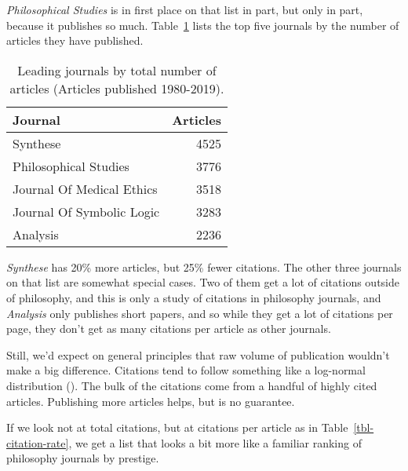 \documentclass[
  10pt,
  letterpaper,
  DIV=11,
  numbers=noendperiod,
  twoside]{scrartcl}
\begin{document}
\emph{Philosophical Studies} is in first place on that list in part, but
only in part, because it publishes so much. Table~\ref{tbl-all-articles}
lists the top five journals by the number of articles they have
published.

\begin{longtable}[]{@{}lr@{}}

\caption{\label{tbl-all-articles}Leading journals by total number of
articles (Articles published 1980-2019).}

\tabularnewline

\toprule\noalign{}
Journal & Articles \\
\midrule\noalign{}
\endhead
\bottomrule\noalign{}
\endlastfoot
Synthese & 4525 \\
Philosophical Studies & 3776 \\
Journal Of Medical Ethics & 3518 \\
Journal Of Symbolic Logic & 3283 \\
Analysis & 2236 \\

\end{longtable}

\emph{Synthese} has 20\% more articles, but 25\% fewer citations. The
other three journals on that list are somewhat special cases. Two of
them get a lot of citations outside of philosophy, and this is only a
study of citations in philosophy journals, and \emph{Analysis} only
publishes short papers, and so while they get a lot of citations per
page, they don't get as many citations per article as other journals.

Still, we'd expect on general principles that raw volume of publication
wouldn't make a big difference. Citations tend to follow something like
a log-normal distribution
(). The bulk of
the citations come from a handful of highly cited articles. Publishing
more articles helps, but is no guarantee.

If we look not at total citations, but at citations per article as in
Table~\ref{tbl-citation-rate}, we get a list that looks a bit more like
a familiar ranking of philosophy journals by prestige.
\end{document}
